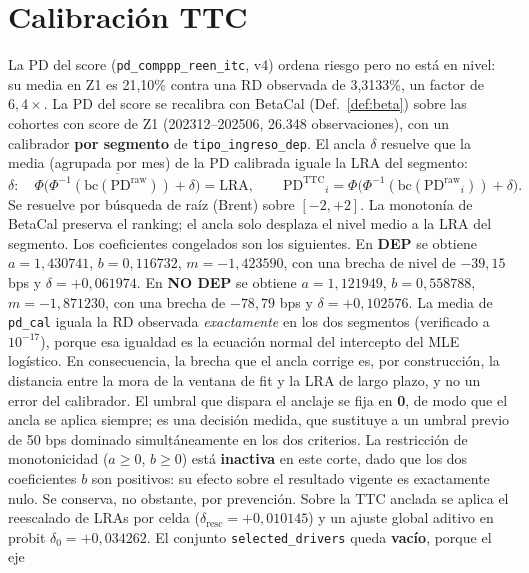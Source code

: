 \documentclass[12pt, a4paper]{article}
\newcommand{\PDTTC}{\ensuremath{\mathrm{PD}^{\mathrm{TTC}}}}
\newcommand{\PDraw}{\ensuremath{\mathrm{PD}^{\mathrm{raw}}}}
\newcommand{\LRA}{\ensuremath{\mathrm{LRA}}}
\begin{document}
\newpage
\section{Calibración TTC}
\label{sec:calttc}
La PD del score (\texttt{pd\_comppp\_reen\_itc}, v4) ordena riesgo pero no está en nivel: su media
en Z1 es 21,10\% contra una RD observada de 3,3133\%, un factor de $6{,}4\times$. La PD del score se
recalibra con BetaCal (Def.~\ref{def:beta}) sobre las cohortes con score de Z1
(202312--202506, 26.348 observaciones), con un calibrador \textbf{por segmento} de
\texttt{tipo\_ingreso\_dep}. El ancla $\delta$ resuelve que la media (agrupada por mes) de la PD
calibrada iguale la LRA del segmento:
\begin{equation}
  \delta:\quad \overline{\Phi\!\big(\Phi^{-1}(\mathrm{bc}(\PDraw))+\delta\big)} = \LRA,
  \qquad \PDTTC_i = \Phi\!\big(\Phi^{-1}(\mathrm{bc}(\PDraw_i))+\delta\big).
\end{equation}
Se resuelve por búsqueda de raíz (Brent) sobre $[-2,+2]$. La monotonía de BetaCal preserva el
ranking; el ancla solo desplaza el nivel medio a la LRA del segmento. Los coeficientes congelados
son los siguientes. En \textbf{DEP} se obtiene $a=1{,}430741$, $b=0{,}116732$, $m=-1{,}423590$,
con una brecha de nivel de $-39{,}15$ bps y $\delta=+0{,}061974$. En \textbf{NO DEP} se obtiene
$a=1{,}121949$, $b=0{,}558788$, $m=-1{,}871230$, con una brecha de $-78{,}79$ bps y
$\delta=+0{,}102576$. La media de \texttt{pd\_cal} iguala la RD observada
\emph{exactamente} en los dos segmentos (verificado a $10^{-17}$), porque esa igualdad es la
ecuación normal del intercepto del MLE logístico. En consecuencia, la brecha que el ancla corrige
es, por construcción, la distancia entre la mora de la ventana de fit y la LRA de largo plazo, y no
un error del calibrador. El umbral que dispara el anclaje se fija en \textbf{0}, de modo que el
ancla se aplica siempre; es una decisión medida, que sustituye a un umbral previo de 50 bps
dominado simultáneamente en los dos criterios. La restricción de monotonicidad
($a\ge0$, $b\ge0$) está \textbf{inactiva} en este corte, dado que los dos coeficientes $b$ son
positivos: su efecto sobre el resultado vigente es exactamente nulo. Se conserva, no obstante, por
prevención. Sobre la TTC anclada se aplica el reescalado de
LRAs por celda ($\delta_{\text{resc}}=+0{,}010145$) y un ajuste global aditivo en probit
$\delta_0=+0{,}034262$. El conjunto \texttt{selected\_drivers} queda \textbf{vacío}, porque el eje
\end{document}
